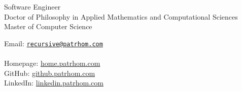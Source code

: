 \begin{minipage}[t]{0.5\textwidth}
  {\LARGE Software Engineer} \vspace{0.5em} \\
  \phantom{1} Doctor of Philosophy in Applied Mathematics and Computational Sciences  \vspace{0.5em} \\
  \phantom{1} Master of Computer Science\\
\end{minipage}
\hfill
\begin{minipage}[t]{0.4\textwidth}
  Email: \href{mailto:recursive@patrhom.com}{\texttt{recursive@patrhom.com}} \\
  \\
  Homepage: \url{home.patrhom.com} \\
  GitHub: \url{github.patrhom.com} \\
  LinkedIn: \url{linkedin.patrhom.com} \\
\end{minipage}
